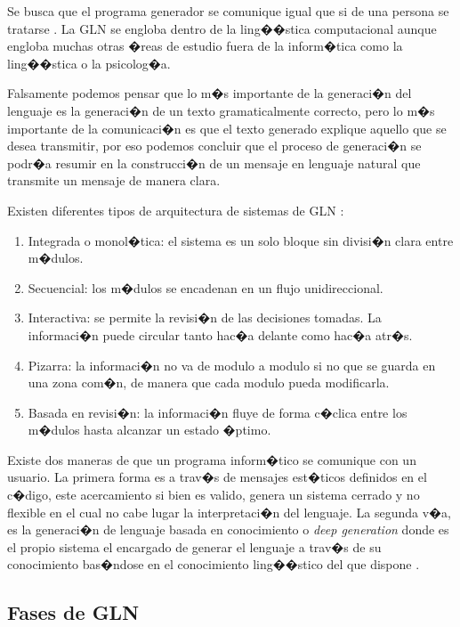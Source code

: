 Se busca que el programa generador se comunique igual que si de una persona se tratarse \citep{Robert2000, VICENTE2015}. La GLN se engloba dentro de la ling��stica computacional aunque engloba muchas otras �reas de estudio fuera de la inform�tica como la ling��stica o la psicolog�a. 

Falsamente podemos pensar que lo m�s importante de la generaci�n del lenguaje es la generaci�n de un texto gramaticalmente correcto, pero lo m�s importante de la comunicaci�n es que el texto generado explique aquello que se desea transmitir, por eso podemos concluir que el proceso de generaci�n se podr�a resumir en la construcci�n de un mensaje en lenguaje natural que transmite un mensaje de manera clara.

Existen diferentes tipos de arquitectura de sistemas de GLN \citep{CarlosGarcia2004}:
\begin{enumerate}
	\item Integrada o monol�tica: el sistema es un solo bloque sin divisi�n clara entre m�dulos.
	\item Secuencial: los m�dulos se encadenan en un flujo unidireccional.
	\item Interactiva: se permite la revisi�n de las decisiones tomadas. La informaci�n puede circular tanto hac�a delante como hac�a atr�s.
	\item Pizarra: la informaci�n no va de modulo a modulo si no que se guarda en una zona com�n, de manera que cada modulo pueda modificarla.
	\item Basada  en revisi�n: la informaci�n fluye de forma c�clica entre los m�dulos hasta alcanzar un estado �ptimo.
\end{enumerate}
	
Existe dos maneras de que un programa inform�tico se comunique con un usuario. La primera forma es a trav�s de mensajes est�ticos definidos en el c�digo, este acercamiento si bien es valido, genera un sistema cerrado y no flexible en el cual no cabe lugar la interpretaci�n del lenguaje. La segunda v�a, es la generaci�n de lenguaje basada en conocimiento o \textit{deep generation} donde es el propio sistema el encargado de generar el lenguaje a trav�s de su conocimiento bas�ndose en el conocimiento ling��stico del que dispone \citep{CarlosGarcia2004}.

\subsection{Fases de GLN}

